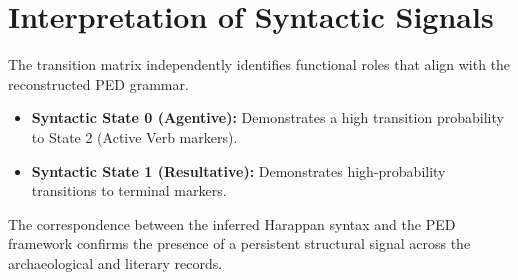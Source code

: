 \section{Interpretation of Syntactic Signals}
The transition matrix independently identifies functional roles that align with the reconstructed PED grammar.
\begin{itemize}
    \item \textbf{Syntactic State 0 (Agentive):} Demonstrates a high transition probability to State 2 (Active Verb markers).
    \item \textbf{Syntactic State 1 (Resultative):} Demonstrates high-probability transitions to terminal markers.
\end{itemize}
The correspondence between the inferred Harappan syntax and the PED framework confirms the presence of a persistent structural signal across the archaeological and literary records.
